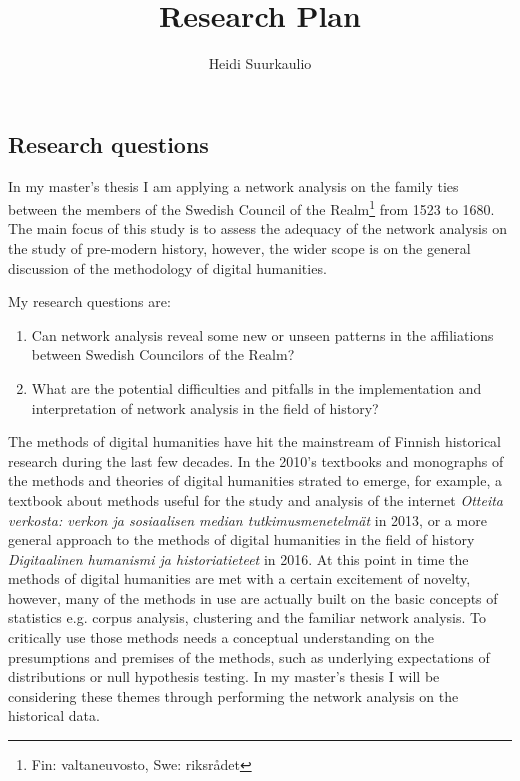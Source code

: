 \documentclass[a4paper,12pt]{article}
\title{Research Plan}
\author{Heidi Suurkaulio}
\begin{document}
\maketitle
\begin{onehalfspace}

\section{Research questions}
In my master's thesis I am applying a network analysis on the family ties between the members of the Swedish Council of the Realm\footnote{Fin: valtaneuvosto, Swe: riksrådet} from 1523 to 1680. The main focus of this study is to assess the adequacy of the network analysis on the study of pre-modern history, however, the wider scope is on the general discussion of the methodology of digital humanities. 

My research questions are:
\begin{enumerate}
	\item Can network analysis reveal some new or unseen patterns in the affiliations between Swedish Councilors of the Realm? 
	\item What are the potential difficulties and pitfalls in the implementation and interpretation of network analysis in the field of history?
\end{enumerate}   

The methods of digital humanities have hit the mainstream of Finnish historical research during the last few decades. In the 2010's textbooks and monographs of the methods and theories of digital humanities strated to emerge, for example, a textbook about methods useful for the study and analysis of the internet \textit{Otteita verkosta: verkon ja sosiaalisen median tutkimusmenetelmät} in 2013, or a more general approach to the methods of digital humanities in the field of history \textit{Digitaalinen humanismi ja historiatieteet} in 2016. At this point in time the methods of digital humanities are met with a certain excitement of novelty, however, many of the methods in use are actually built on the basic concepts of statistics e.g. corpus analysis, clustering and the familiar network analysis. To critically use those methods needs a conceptual understanding on the presumptions and premises of the methods, such as underlying expectations of distributions or null hypothesis testing. In my master's thesis I will be considering these themes through performing the network analysis on the historical data.


\end{onehalfspace}
\end{document}
